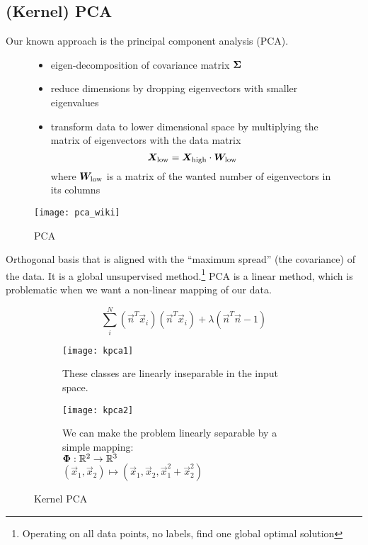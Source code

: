 
\subsection{(Kernel) PCA}

Our known approach is the principal component analysis (PCA).

\begin{figure}[H]
	\centering
	\begin{minipage}[c]{0.65\textwidth}
		\begin{itemize}
			\item eigen-decomposition of covariance matrix $\bm{\Sigma}$
			\item reduce dimensions by dropping eigenvectors with smaller eigenvalues
			\item transform data to lower dimensional space by multiplying the matrix of eigenvectors with the data matrix \[\bm{X}_{\mathrm{low}} = \bm{X}_{\mathrm{high}} \cdot \bm{W}_{\mathrm{low}}\] where $\bm{W}_{\mathrm{low}}$ is a matrix of the wanted number of eigenvectors in its columns
		\end{itemize}
	\end{minipage}
	\hfill
	\begin{minipage}[c]{0.28\textwidth}
		\texttt{[image: pca\_wiki]}
		\caption{PCA}
	\end{minipage}
\end{figure}

Orthogonal basis that is aligned with the ``maximum spread'' (\wrt the covariance) of the data. It is a global unsupervised method.\footnote{Operating on all data points, no labels, find one global optimal solution} PCA is a linear method, which is problematic when we want a non-linear mapping of our data.

\begin{equation*}
    \sum_{i}^{N}\left(\vec{n}^T \vec{x}_i\right)\left(\vec{n}^T \vec{x}_i\right) + \lambda \left(\vec{n}^T \vec{n} - 1\right)
\end{equation*}

\begin{figure}[H]
	\centering
	\begin{subfigure}[t]{0.475\textwidth}
	  \centering
		\texttt{[image: kpca1]}
		\caption{These classes are linearly inseparable in the input space.}
	\end{subfigure}
	\hfill
	\begin{subfigure}[t]{0.475\textwidth}
	  \centering
		\texttt{[image: kpca2]}
		\caption{We can make the problem linearly separable by a simple mapping:\\$\bm{\Phi}:\mathbb{R}^2\to\mathbb{R}^3$\\$(\vec{x}_1, \vec{x}_2)\mapsto\left(\vec{x}_1, \vec{x}_2, \vec{x}_1^2+\vec{x}_2^2\right)$}
	\end{subfigure}
	\caption{Kernel PCA}
\end{figure}

